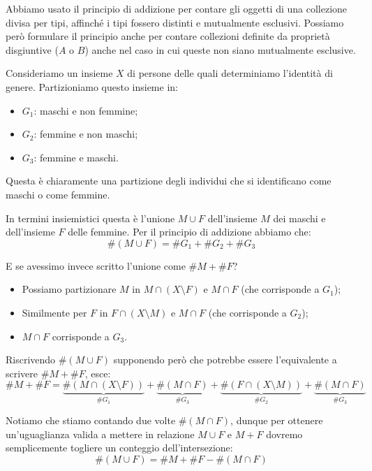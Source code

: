 \documentclass[12pt]{report}
\begin{document}
	Abbiamo usato il principio di addizione per contare gli oggetti di una collezione divisa per tipi, affinché i tipi fossero distinti e mutualmente esclusivi. Possiamo però formulare il principio anche per contare collezioni definite da proprietà disgiuntive ($A$ o $B$) anche nel caso in cui queste non siano mutualmente esclusive.
	
	Consideriamo un insieme $X$ di persone delle quali determiniamo l'identità di genere. Partizioniamo questo insieme in:
	\begin{itemize}
		
		\item $G_1$: maschi e non femmine;
		
		\item $G_2$: femmine e non maschi;
		
		\item $G_3$: femmine e maschi.
	
	\end{itemize}
	Questa è chiaramente una partizione degli individui che si identificano come maschi o come femmine.
	
	In termini insiemistici questa è l'unione $M \cup F$ dell'insieme $M$ dei maschi e dell'insieme $F$ delle femmine. Per il principio di addizione abbiamo che:
	\[
		\#(M \cup F) = \#G_1 + \#G_2 + \#G_3
	\]
	
	E se avessimo invece scritto l'unione come $\#M + \#F$?
	\begin{itemize}
		
		\item Possiamo partizionare $M$ in $M \cap (X \setminus F)$ e $M \cap F$ (che corrisponde a $G_1$);
		
		\item Similmente per $F$ in $F \cap (X \setminus M)$ e $M \cap F$ (che corrisponde a $G_2$);
		
		\item $M \cap F$ corrisponde a $G_3$.
		
	\end{itemize}
	
	Riscrivendo $\#(M \cup F)$ supponendo però che potrebbe essere l'equivalente a scrivere $\#M + \#F$, esce:
	\[
		\#M + \#F = \underbrace{\#\left(M \cap (X \setminus F)\right)}_{\#G_1} + \underbrace{\#\left(M \cap F\right)}_{\#G_3} + \underbrace{\#\left(F \cap (X \setminus M)\right)}_{\#G_2} + \underbrace{\#\left(M \cap F\right)}_{\#G_3}
	\]
	
	Notiamo che stiamo contando due volte $\#(M \cap F)$, dunque per ottenere un'uguaglianza valida a mettere in relazione $M \cup F$ e $M + F$ dovremo semplicemente togliere un conteggio dell'intersezione:
	\[
		\#(M \cup F) = \#M + \#F - \#(M \cap F)
	\]
	
\end{document}

